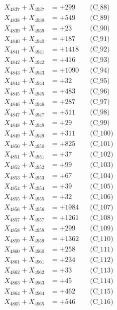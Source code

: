 \documentclass[a4paper,10pt]{article}
\begin{document}
{\begin{align}
X_{4837} + X_{4937} &= +299 && \text{(C\_88)} \\
X_{4838} + X_{4938} &= +549 && \text{(C\_89)} \\
X_{4839} + X_{4939} &= +23 && \text{(C\_90)} \\
\allowbreak
X_{4840} + X_{4940} &= +187 && \text{(C\_91)} \\
X_{4841} + X_{4941} &= +1418 && \text{(C\_92)} \\
X_{4842} + X_{4942} &= +416 && \text{(C\_93)} \\
X_{4843} + X_{4943} &= +1090 && \text{(C\_94)} \\
X_{4844} + X_{4944} &= +32 && \text{(C\_95)} \\
\allowbreak
X_{4845} + X_{4945} &= +483 && \text{(C\_96)} \\
X_{4846} + X_{4946} &= +287 && \text{(C\_97)} \\
X_{4847} + X_{4947} &= +511 && \text{(C\_98)} \\
X_{4848} + X_{4948} &= +29 && \text{(C\_99)} \\
X_{4849} + X_{4949} &= +311 && \text{(C\_100)} \\
\allowbreak
X_{4850} + X_{4950} &= +825 && \text{(C\_101)} \\
X_{4851} + X_{4951} &= +37 && \text{(C\_102)} \\
X_{4852} + X_{4952} &= +99 && \text{(C\_103)} \\
X_{4853} + X_{4953} &= +67 && \text{(C\_104)} \\
X_{4854} + X_{4954} &= +39 && \text{(C\_105)} \\
\allowbreak
X_{4855} + X_{4955} &= +32 && \text{(C\_106)} \\
X_{4856} + X_{4956} &= +1984 && \text{(C\_107)} \\
X_{4857} + X_{4957} &= +1261 && \text{(C\_108)} \\
X_{4858} + X_{4958} &= +299 && \text{(C\_109)} \\
X_{4859} + X_{4959} &= +1362 && \text{(C\_110)} \\
\allowbreak
X_{4860} + X_{4960} &= +258 && \text{(C\_111)} \\
X_{4861} + X_{4961} &= +234 && \text{(C\_112)} \\
X_{4862} + X_{4962} &= +33 && \text{(C\_113)} \\
X_{4863} + X_{4963} &= +45 && \text{(C\_114)} \\
X_{4864} + X_{4964} &= +462 && \text{(C\_115)} \\
\allowbreak
X_{4865} + X_{4965} &= +546 && \text{(C\_116)} \\

\end{align}}
\end{document}
